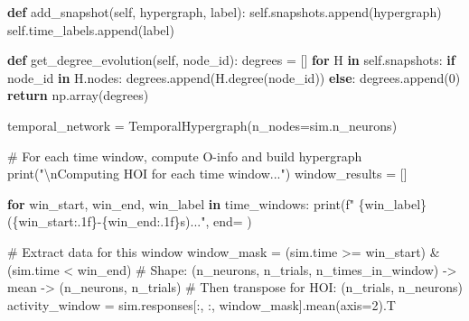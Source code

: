 \documentclass[
  11pt,
  letterpaper,
  oneside,
  openany]{book}
\newenvironment{Shaded}{\begin{snugshade}}{\end{snugshade}}
\newcommand{\BuiltInTok}[1]{\textcolor[rgb]{0.00,0.23,0.31}{#1}}
\newcommand{\CharTok}[1]{\textcolor[rgb]{0.13,0.47,0.30}{#1}}
\newcommand{\CommentTok}[1]{\textcolor[rgb]{0.37,0.37,0.37}{#1}}
\newcommand{\ControlFlowTok}[1]{\textcolor[rgb]{0.00,0.23,0.31}{\textbf{#1}}}
\newcommand{\DecValTok}[1]{\textcolor[rgb]{0.68,0.00,0.00}{#1}}
\newcommand{\KeywordTok}[1]{\textcolor[rgb]{0.00,0.23,0.31}{\textbf{#1}}}
\newcommand{\NormalTok}[1]{\textcolor[rgb]{0.00,0.23,0.31}{#1}}
\newcommand{\OperatorTok}[1]{\textcolor[rgb]{0.37,0.37,0.37}{#1}}
\newcommand{\SpecialCharTok}[1]{\textcolor[rgb]{0.37,0.37,0.37}{#1}}
\newcommand{\SpecialStringTok}[1]{\textcolor[rgb]{0.13,0.47,0.30}{#1}}
\newcommand{\StringTok}[1]{\textcolor[rgb]{0.13,0.47,0.30}{#1}}
\newcommand{\VariableTok}[1]{\textcolor[rgb]{0.07,0.07,0.07}{#1}}
\begin{document}
\begin{Shaded}
\begin{Highlighting}[]
    \KeywordTok{def}\NormalTok{ add\_snapshot(}\VariableTok{self}\NormalTok{, hypergraph, label):}
        \VariableTok{self}\NormalTok{.snapshots.append(hypergraph)}
        \VariableTok{self}\NormalTok{.time\_labels.append(label)}
    
    \KeywordTok{def}\NormalTok{ get\_degree\_evolution(}\VariableTok{self}\NormalTok{, node\_id):}
\NormalTok{        degrees }\OperatorTok{=}\NormalTok{ []}
        \ControlFlowTok{for}\NormalTok{ H }\KeywordTok{in} \VariableTok{self}\NormalTok{.snapshots:}
            \ControlFlowTok{if}\NormalTok{ node\_id }\KeywordTok{in}\NormalTok{ H.nodes:}
\NormalTok{                degrees.append(H.degree(node\_id))}
            \ControlFlowTok{else}\NormalTok{:}
\NormalTok{                degrees.append(}\DecValTok{0}\NormalTok{)}
        \ControlFlowTok{return}\NormalTok{ np.array(degrees)}

\NormalTok{temporal\_network }\OperatorTok{=}\NormalTok{ TemporalHypergraph(n\_nodes}\OperatorTok{=}\NormalTok{sim.n\_neurons)}

\CommentTok{\# For each time window, compute O{-}info and build hypergraph}
\BuiltInTok{print}\NormalTok{(}\StringTok{"}\CharTok{\textbackslash{}n}\StringTok{Computing HOI for each time window..."}\NormalTok{)}
\NormalTok{window\_results }\OperatorTok{=}\NormalTok{ []}

\ControlFlowTok{for}\NormalTok{ win\_start, win\_end, win\_label }\KeywordTok{in}\NormalTok{ time\_windows:}
    \BuiltInTok{print}\NormalTok{(}\SpecialStringTok{f"  }\SpecialCharTok{\{}\NormalTok{win\_label}\SpecialCharTok{\}}\SpecialStringTok{ (}\SpecialCharTok{\{}\NormalTok{win\_start}\SpecialCharTok{:.1f\}}\SpecialStringTok{{-}}\SpecialCharTok{\{}\NormalTok{win\_end}\SpecialCharTok{:.1f\}}\SpecialStringTok{s)..."}\NormalTok{, end}\OperatorTok{=}\StringTok{\textquotesingle{} \textquotesingle{}}\NormalTok{)}
    
    \CommentTok{\# Extract data for this window}
\NormalTok{    window\_mask }\OperatorTok{=}\NormalTok{ (sim.time }\OperatorTok{\textgreater{}=}\NormalTok{ win\_start) }\OperatorTok{\&}\NormalTok{ (sim.time }\OperatorTok{\textless{}}\NormalTok{ win\_end)}
    \CommentTok{\# Shape: (n\_neurons, n\_trials, n\_times\_in\_window) {-}\textgreater{} mean {-}\textgreater{} (n\_neurons, n\_trials)}
    \CommentTok{\# Then transpose for HOI: (n\_trials, n\_neurons)}
\NormalTok{    activity\_window }\OperatorTok{=}\NormalTok{ sim.responses[:, :, window\_mask].mean(axis}\OperatorTok{=}\DecValTok{2}\NormalTok{).T}
    

\end{Highlighting}
\end{Shaded}
\end{document}

